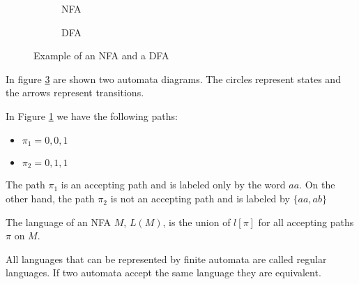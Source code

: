 \begin{figure}[ht]
\begin{subfigure}{.5\textwidth}
  \centering
  \caption{NFA}
  \label{fig:nfa}
\end{subfigure}
\begin{subfigure}{.5\textwidth}
  \centering
  \caption{DFA}
  \label{fig:dfa}
\end{subfigure}
\caption{Example of an NFA and a DFA}
\label{fig:automaton_example}
\end{figure}

In figure \ref{fig:automaton_example} are shown two automata diagrams. The circles represent states and the arrows represent transitions.

In Figure \ref{fig:nfa} we have the following paths:
\begin{itemize}
  \item $\pi_1 = 0,0,1$
  \item $\pi_2 = 0,1,1$
\end{itemize}

The path $\pi_1$ is an accepting path and is labeled only by the word $aa$. On the other hand, the path $\pi_2$ is not an accepting path and is labeled by $\{aa,ab\}$

\begin{definition}
The language of an NFA $M$, $L(M)$, is the union of $l[\pi]$ for all accepting paths $\pi$ on $M$.
\end{definition}

All languages that can be represented by finite automata are called regular languages. If two automata accept the same language they are equivalent.

